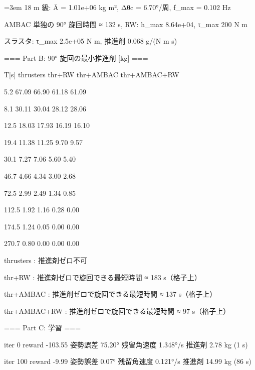 {\footnotesize\raggedright\sloppy\setlength{\parindent}{0pt}\setlength{\parskip}{0pt}\emergencystretch=3em
18 m 級: Ā = 1.01e+06 kg m², Δθc = 6.70°/周, f\_max = 0.102 Hz\par
  AMBAC 単独の 90° 旋回時間 ≈ 132 s, RW: h\_max 8.64e+04, τ\_max 200 N m\par
  スラスタ: τ\_max 2.5e+05 N m, 推進剤 0.068 g/(N m s)\par
\mbox{}\par
=== Part B: 90° 旋回の最小推進剤 [kg] ===\par
   T[s]       thrusters         thr+RW      thr+AMBAC   thr+AMBAC+RW\par
    5.2           67.09          66.90          61.18          61.09\par
    8.1           30.11          30.04          28.12          28.06\par
   12.5           18.03          17.93          16.19          16.10\par
   19.4           11.38          11.25           9.70           9.57\par
   30.1            7.27           7.06           5.60           5.40\par
   46.7            4.66           4.34           3.00           2.68\par
   72.5            2.99           2.49           1.34           0.85\par
  112.5            1.92           1.16           0.28           0.00\par
  174.5            1.24           0.05           0.00           0.00\par
  270.7            0.80           0.00           0.00           0.00\par
  thrusters     : 推進剤ゼロ不可\par
  thr+RW        : 推進剤ゼロで旋回できる最短時間 ≈ 183 s（格子上）\par
  thr+AMBAC     : 推進剤ゼロで旋回できる最短時間 ≈ 137 s（格子上）\par
  thr+AMBAC+RW  : 推進剤ゼロで旋回できる最短時間 ≈ 97 s（格子上）\par
\mbox{}\par
=== Part C: 学習 ===\par
iter    0  reward  -103.55  姿勢誤差  75.20°  残留角速度 1.348°/s  推進剤   2.78 kg  (1 s)\par
iter  100  reward    -9.99  姿勢誤差   0.07°  残留角速度 0.121°/s  推進剤  14.99 kg  (86 s)\par
}
